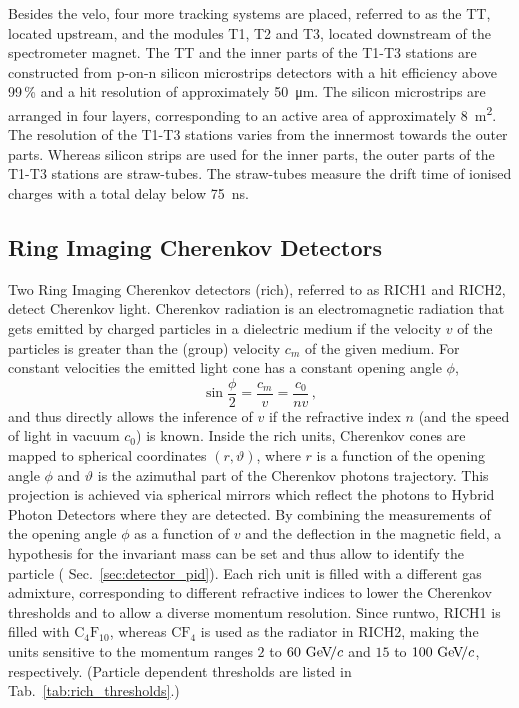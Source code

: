 Besides the \gls{velo}, four more tracking systems are placed, referred to as the TT, located upstream, and the modules T1, T2 and T3, located downstream of the spectrometer magnet.
The TT and the inner parts of the T1-T3 stations are constructed from p-on-n silicon microstrips detectors with a hit efficiency above 99\,\% and a hit resolution of approximately \SI{50}{\micro\meter}.
The silicon microstrips are arranged in four layers, corresponding to an active area of approximately \SI{8}{\meter\squared}.
The resolution of the T1-T3 stations varies from the innermost towards the outer parts.
Whereas silicon strips are used for the inner parts, the outer parts of the T1-T3 stations are straw-tubes.
The straw-tubes measure the drift time of ionised charges with a total delay below \SI{75}{\nano\second}.

\subsection{Ring Imaging Cherenkov Detectors}
Two Ring Imaging Cherenkov detectors (\gls{rich}), referred to as RICH1 and RICH2, detect Cherenkov light.
Cherenkov radiation is an electromagnetic radiation that gets emitted by charged particles in a dielectric medium if the velocity $v$ of the particles is greater than the (group) velocity $c_m$ of the given medium.
For constant velocities the emitted light cone has a constant opening angle $\phi$,
\begin{equation*}
    \sin \frac{\phi}{2} = \frac{c_m}{v} = \frac{c_0}{nv} \,,
\end{equation*}
and thus directly allows the inference of $v$ if the refractive index $n$ (and the speed of light in vacuum $c_0$) is known.
Inside the \gls{rich} units, Cherenkov cones are mapped to spherical coordinates $(r,\vartheta)$, where $r$ is a function of the opening angle $\phi$ and $\vartheta$ is the azimuthal part of the Cherenkov photons trajectory.
This projection is achieved via spherical mirrors which reflect the photons to Hybrid Photon Detectors where they are detected.
By combining the measurements of the opening angle $\phi$ as a function of $v$ and the deflection in the magnetic field, a hypothesis for the invariant mass can be set and thus allow to identify the particle (\cf{} Sec.~\ref{sec:detector_pid}).
Each \gls{rich} unit is filled with a different gas admixture, corresponding to different refractive indices to lower the Cherenkov thresholds and to allow a diverse momentum resolution.
Since \gls{runtwo}, RICH1 is filled with $\mathrm{C}_4\mathrm{F}_{10}$, whereas $\mathrm{CF}_4$ is used as the radiator in RICH2, making the units sensitive to the momentum ranges $2$ to $60\,{\mathrm{\,Ge\kern -0.1em V\!/}c}$ and $15$ to $100\,{\mathrm{\,Ge\kern -0.1em V\!/}c}$, respectively. (Particle dependent thresholds are listed in Tab.~\ref{tab:rich_thresholds}.)


